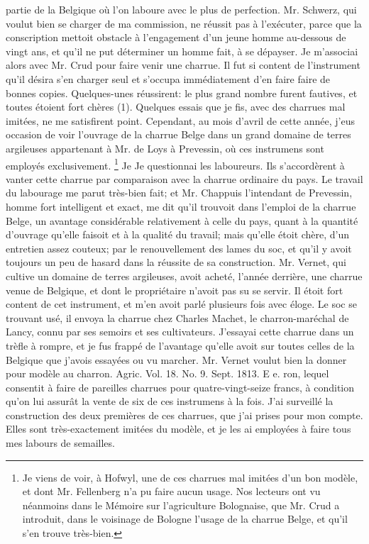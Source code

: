 \setcounter{page}{360} partie de la Belgique où l'on laboure avec le plus de perfection. Mr. Schwerz, qui voulut bien se charger de ma commission, ne réussit pas à l'exécuter, parce que la conscription mettoit obstacle à l'engagement d'un jeune homme au-dessous de vingt ans, et qu'il ne put déterminer un homme fait, à se dépayser. Je m'associai alors avec Mr. Crud pour faire venir une charrue. Il fut si content de l'instrument qu'il désira s'en charger seul et s'occupa immédiatement d'en faire faire de bonnes copies. Quelques-unes réussirent: le plus grand nombre furent fautives, et toutes étoient fort chères (1). Quelques essais que je fis, avec des charrues mal imitées, ne me satisfirent point. Cependant, au mois d'avril de cette année, j'eus occasion de voir l'ouvrage de la charrue Belge dans un grand domaine de terres argileuses appartenant à Mr. de Loys à Prevessin, où ces instrumens sont employés exclusivement.
\footnote{Je viens de voir, à Hofwyl, une de ces charrues mal imitées d'un bon modèle, et dont Mr. Fellenberg n'a pu faire aucun usage. Nos lecteurs ont vu néanmoins dans le Mémoire sur l'agriculture Bolognaise, que Mr. Crud a introduit, dans le voisinage de Bologne l'usage de la charrue Belge, et qu'il s'en trouve très-bien.}
Je\setcounter{page}{361} Je questionnai les laboureurs. Ils s'accordèrent à vanter cette charrue par comparaison avec la charrue ordinaire du pays. Le travail du labourage me parut très-bien fait; et Mr. Chappuis l'intendant de Prevessin, homme fort intelligent et exact, me dit qu'il trouvoit dans l'emploi de la charrue Belge, un avantage considérable relativement à celle du pays, quant à la quantité d'ouvrage qu'elle faisoit et à la qualité du travail; mais qu'elle étoit chère, d'un entretien assez couteux; par le renouvellement des lames du soc, et qu'il y avoit toujours un peu de hasard dans la réussite de sa construction.
Mr. Vernet, qui cultive un domaine de terres argileuses, avoit acheté, l'année derrière, une charrue venue de Belgique, et dont le propriétaire n'avoit pas su se servir. Il étoit fort content de cet instrument, et m'en avoit parlé plusieurs fois avec éloge. Le soc se trouvant usé, il envoya la charrue chez Charles Machet, le charron-maréchal de Lancy, connu par ses semoirs et ses cultivateurs. J'essayai cette charrue dans un trèfle à rompre, et je fus frappé de l'avantage qu'elle avoit sur toutes celles de la Belgique que j'avois essayées ou vu marcher. Mr. Vernet voulut bien la donner pour modèle au charron. Agric. Vol. 18. No. 9. Sept. 1813. E e.\setcounter{page}{362} ron, lequel consentit à faire de pareilles charrues pour quatre-vingt-seize francs, à condition qu'on lui assurât la vente de six de ces instrumens à la fois. J'ai surveillé la construction des deux premières de ces charrues, que j'ai prises pour mon compte. Elles sont très-exactement imitées du modèle, et je les ai employées à faire tous mes labours de semailles.
